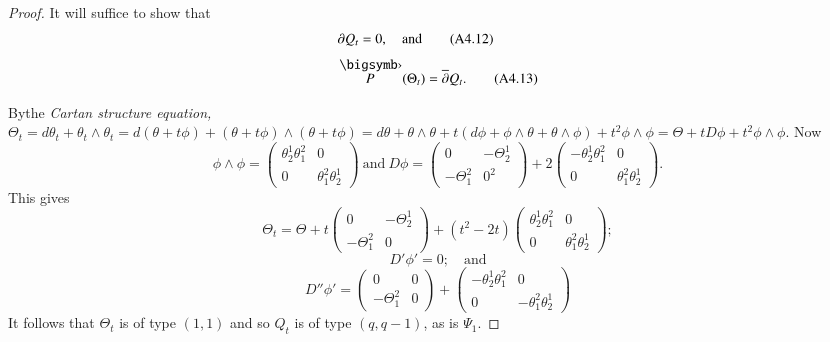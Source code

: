 \begin{proof}
It will suffice to show that
\begin{align*}
& \partial Q_{t}=0,\quad\text{and}\tag{A4.12}\label{art08-sec4-eqA4.12}\\[3pt]
& \overdot{P}(\Theta_{t})=\overline{\partial}Q_{t}.\tag{A4.13}\label{art08-sec4-eqA4.13}
\end{align*}

By\pageoriginale the {\em Cartan structure equation,} $\Theta_{t}=d\theta_{t}+\theta_{t}\wedge \theta_{t}=d(\theta+t\phi)+(\theta+t\phi)\wedge (\theta+t\phi)=d\theta+\theta\wedge\theta+t(d\phi+\phi\wedge \theta+\theta\wedge\phi)+t^{2}\phi\wedge \phi=\Theta+tD\phi+t^{2}\phi\wedge\phi$. Now
$$
\phi\wedge \phi=\left(\begin{matrix} \theta^{1}_{2}\theta^{2}_{1} & 0 \\ 0 & \theta^{2}_{1}\theta^{1}_{2}\end{matrix}\right)~\text{and}~ D\phi=\left(\begin{matrix} 0 & -\Theta^{1}_{2}\\ -\Theta^{2}_{1} & 0^{2}\end{matrix}\right)+2\left(\begin{matrix} -\theta^{1}_{2}\theta^{2}_{1} & 0\\ 0 & \theta^{2}_{1}\theta^{1}_{2}\end{matrix}\right).
$$
This gives
\begin{equation*}
\Theta_{t}=\Theta+t\left(\begin{matrix} 0 & -\Theta^{1}_{2}\\ -\Theta^{2}_{1} & 0\end{matrix}\right)+(t^{2}-2t)\left(\begin{matrix} \theta^{1}_{2}\theta^{2}_{1} & 0\\ 0 & \theta^{2}_{1}\theta^{1}_{2}\end{matrix}\right);\tag{A4.14}\label{art08-sec4-eqA4.14}
\end{equation*}
\begin{equation*}
D'\phi'=0;\quad\text{and}\tag{A4.15}\label{art08-sec4-eqA4.15}
\end{equation*}
\begin{equation*}
D''\phi'=\left(\begin{matrix} 0 & 0 \\ -\Theta^{2}_{1} & 0\end{matrix}\right)+\left(\begin{matrix}-\theta^{1}_{2}\theta^{2}_{1} & 0\\ 0 & -\theta^{2}_{1}\theta^{1}_{2}\end{matrix}\right)\tag{A4.16}\label{art08-sec4-eqA4.16}
\end{equation*}
It follows that $\Theta_{t}$ is of type $(1,1)$ and so $Q_{t}$ is of type $(q,q-1)$, as is $\Psi_{1}$.


\end{proof}
